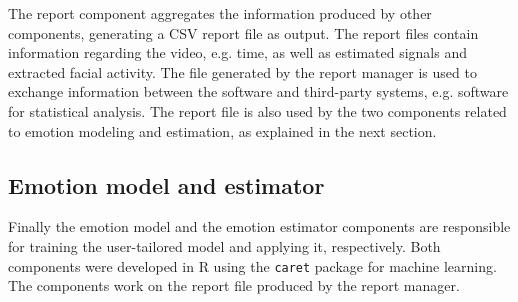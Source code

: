 The report component aggregates the information produced by other components, generating a CSV report file as output. The report files contain information regarding the video, e.g. time, as well as estimated signals and extracted facial activity. The file generated by the report manager is used to exchange information between the software and third-party systems, e.g. software for statistical analysis. The report file is also used by the two components related to emotion modeling and estimation, as explained in the next section.

\subsection{Emotion model and estimator}

Finally the emotion model and the emotion estimator components are responsible for training the user-tailored model and applying it, respectively. Both components were developed in R using the \texttt{caret} package for machine learning. The components work on the report file produced by the report manager.
